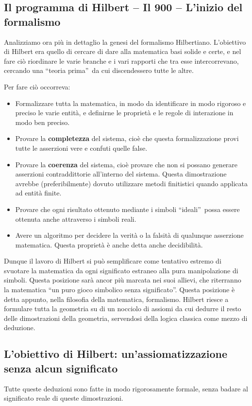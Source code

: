 \documentclass[a4paper,10pt]{article}
\begin{document}
\subsection[L'inizio del formalismo]{Il programma di Hilbert -- Il 900 -- L'inizio del formalismo}
Analizziamo ora più in dettaglio la genesi del formalismo Hilbertiano.
L'obiettivo di Hilbert era quello di cercare di dare alla matematica basi solide e certe, e nel fare ciò riordinare le varie branche e i vari rapporti che tra esse intercorrevano, cercando una \textquotedblleft teoria prima\textquotedblright\ da cui discendessero tutte le altre.

Per fare ciò occorreva:
\begin{itemize}
 \item Formalizzare tutta la matematica, in modo da identificare in modo rigoroso e preciso le varie entità, e definirne le proprietà e le regole di interazione in modo ben preciso.
 \item Provare la \textbf{completezza} del sistema, cioè che questa formalizzazione provi tutte le asserzioni vere e confuti quelle false.
 \item Provare la \textbf{coerenza} del sistema, cioè provare che non si possano generare asserzioni contraddittorie all'interno del sistema. Questa dimostrazione avrebbe (preferibilmente) dovuto utilizzare metodi finitistici quando applicata ad entità finite.
 \item Provare che ogni risultato ottenuto mediante i simboli \textquotedblleft ideali\textquotedblright\ possa essere ottenuta anche attraverso i simboli reali.
 \item Avere un algoritmo per decidere la verità o la falsità di qualunque asserzione matematica. Questa proprietà è anche detta anche decidibilità.
\end{itemize}

Dunque il lavoro di Hilbert si può semplificare come tentativo estremo di svuotare la matematica da ogni significato estraneo alla pura manipolazione di simboli. Questa posizione sarà ancor più marcata nei suoi allievi, che riterranno la matematica “un puro gioco simbolico senza significato”.
Questa posizione è detta appunto, nella filosofia della matematica, formalismo.
Hilbert riesce a formulare tutta la geometria su di un nocciolo di assiomi da cui dedurre il resto delle dimostrazioni della geometria, servendosi della logica classica come mezzo di deduzione.

\subsection{L'obiettivo di Hilbert: un'assiomatizzazione senza alcun significato}
Tutte queste deduzioni sono fatte in modo rigorosamente formale, senza badare al significato reale di queste dimostrazioni.
\end{document}
